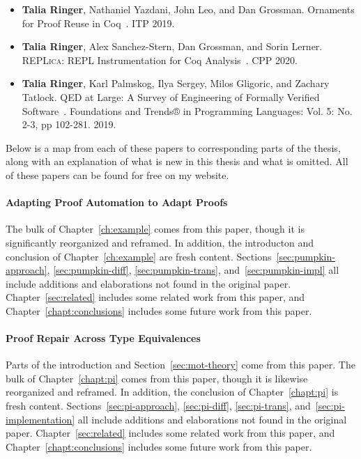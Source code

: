 \begin{itemize}
\item \textbf{Talia Ringer}, Nathaniel Yazdani, John Leo, and Dan Grossman. Ornaments for Proof Reuse in Coq~\cite{Ringer2019}. ITP 2019.
\item \textbf{Talia Ringer}, Alex Sanchez-Stern, Dan Grossman, and Sorin Lerner. \textsc{REPLica}: REPL Instrumentation for Coq Analysis~\cite{replica}. CPP 2020.
\item \textbf{Talia Ringer}, Karl Palmskog, Ilya Sergey, Milos Gligoric, and Zachary Tatlock. QED at Large: A Survey of Engineering of Formally Verified Software~\cite{PGL-045}. Foundations and Trends® in Programming Languages: Vol. 5: No. 2-3, pp 102-281. 2019. 
\end{itemize}
Below is a map from each of these papers to corresponding parts of the thesis,
along with an explanation of what is new in this thesis and what is omitted.
All of these papers can be found for free on my website.

\paragraph{Adapting Proof Automation to Adapt Proofs}
The bulk of Chapter~\ref{ch:example} comes from this paper,
though it is significantly reorganized and reframed.
In addition, the introducton and conclusion of Chapter~\ref{ch:example} are fresh content.
Sections~\ref{sec:pumpkin-approach}, \ref{sec:pumpkin-diff}, \ref{sec:pumpkin-trans}, and~\ref{sec:pumpkin-impl}
all include additions and elaborations not found in the original paper.
Chapter~\ref{sec:related} includes some related work from this paper,
and Chapter~\ref{chapt:conclusions} includes some future work from this paper.

\paragraph{Proof Repair Across Type Equivalences}
Parts of the introduction and Section~\ref{sec:mot-theory} come from this paper.
The bulk of Chapter~\ref{chapt:pi} comes from this paper,
though it is likewise reorganized and reframed.
In addition, the conclusion of Chapter~\ref{chapt:pi} is fresh content.
Sections~\ref{sec:pi-approach}, \ref{sec:pi-diff}, \ref{sec:pi-trans}, and~\ref{sec:pi-implementation}
all include additions and elaborations not found in the original paper.
Chapter~\ref{sec:related} includes some related work from this paper,
and Chapter~\ref{chapt:conclusions} includes some future work from this paper.

